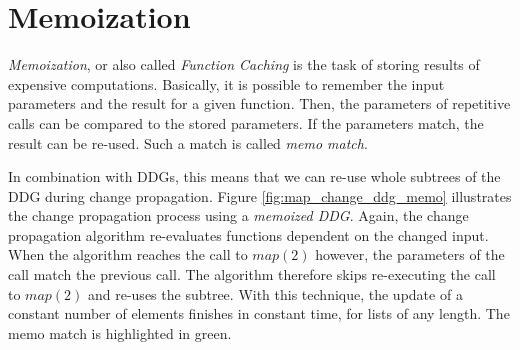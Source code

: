 \section{Memoization}

\textit{Memoization}, or also called \textit{Function Caching} is the task of storing results of expensive computations. Basically, it is possible to remember the input parameters and the result for a given function. Then, the parameters of repetitive calls can be compared to the stored parameters. If the parameters match, the result can be re-used. Such a match is called \textit{memo match}.

In combination with DDGs, this means that we can re-use whole subtrees of the DDG during change propagation. Figure \ref{fig:map_change_ddg_memo} illustrates the change propagation process using a \textit{memoized DDG}. Again, the change propagation algorithm re-evaluates functions dependent on the changed input. When the algorithm reaches the call to $map(2)$ however, the parameters of the call match the previous call. The algorithm therefore skips re-executing the call to $map(2)$ and re-uses the subtree. With this technique, the update of a constant number of elements finishes in constant time, for lists of any length. 
The memo match is highlighted in green. 


